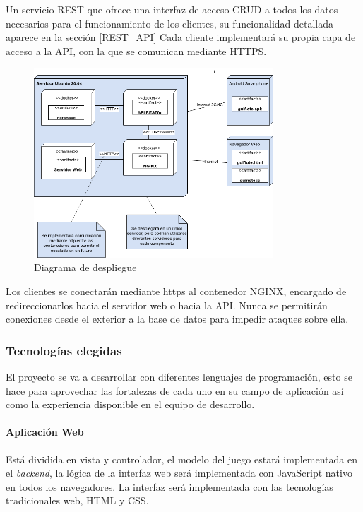 \documentclass{article}
\begin{document}
Un servicio REST que ofrece una interfaz de acceso CRUD a todos los datos necesarios para
el funcionamiento de los clientes, su funcionalidad detallada aparece en la sección \ref{REST_API}
Cada cliente implementará su propia capa de acceso a la API, con la que se comunican mediante
HTTPS.

\begin{figure}[htb]
    \centering
    \includegraphics[width=0.8\textwidth]{./images/diagrama_despliegue.png}
    \caption{Diagrama de despliegue}
    \label{fig:diag_despliegue}
\end{figure}

Los clientes se conectarán mediante https al contenedor NGINX, encargado de redireccionarlos 
hacia el servidor web o hacia la API. 
Nunca se permitirán conexiones desde el exterior a la base de datos para impedir ataques sobre ella. 

\FloatBarrier
\subsubsection{Tecnologías elegidas}

El proyecto se va a desarrollar con diferentes lenguajes de programación, esto se hace para aprovechar las 
fortalezas de cada uno en su campo de aplicación así como la experiencia disponible en el equipo de desarrollo.


\paragraph*{Aplicación Web}

Está dividida en vista y controlador, el modelo del juego estará implementada en el \textit{backend}, 
la lógica de la interfaz web será implementada con JavaScript nativo en todos los navegadores. 
La interfaz será implementada con las tecnologías tradicionales web, HTML y CSS.
\end{document}
